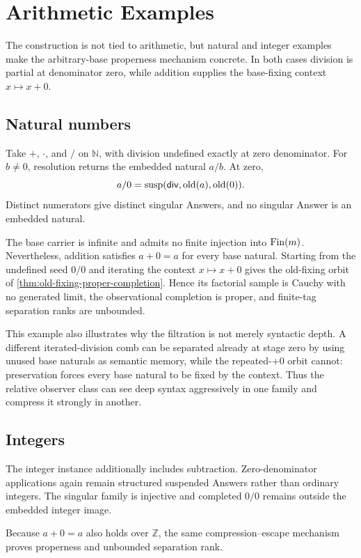 \section{Arithmetic Examples}\label{sec:arithmetic}

The construction is not tied to arithmetic, but natural and integer examples
make the arbitrary-base properness mechanism concrete.  In both cases division
is partial at denominator zero, while addition supplies the base-fixing context
$x\mapsto x+0$.

\subsection{Natural numbers}

Take $+$, $\cdot$, and $/$ on $\mathbb N$, with division undefined exactly
at zero denominator. For $b\ne0$, resolution returns the embedded natural
$a/b$. At zero, \[ a/0=\operatorname{susp}(\mathsf{div},\operatorname{old}(a),\operatorname{old}(0)). \] Distinct
numerators give distinct singular Answers, and no singular Answer is an
embedded natural.

The base carrier is infinite and admits no finite injection into $\operatorname{Fin}(m)$.
Nevertheless, addition satisfies $a+0=a$ for every base natural. Starting
from the undefined seed $0/0$ and iterating the context $x\mapsto x+0$ gives
the old-fixing orbit of \cref{thm:old-fixing-proper-completion}. Hence its
factorial sample is Cauchy with no generated limit, the observational
completion is proper, and finite-tag separation ranks are unbounded.

This example also illustrates why the filtration is not merely syntactic depth.
A different iterated-division comb can be separated already at stage zero by
using unused base naturals as semantic memory, while the repeated-$+0$ orbit
cannot: preservation forces every base natural to be fixed by the context.
Thus the relative observer class can see deep syntax aggressively in one family
and compress it strongly in another.

\subsection{Integers}

The integer instance additionally includes subtraction. Zero-denominator
applications again remain structured suspended Answers rather than ordinary
integers. The singular family is injective and completed $0/0$ remains
outside the embedded integer image.

Because $a+0=a$ also holds over $\mathbb Z$, the same compression--escape
mechanism proves properness and unbounded separation rank.

